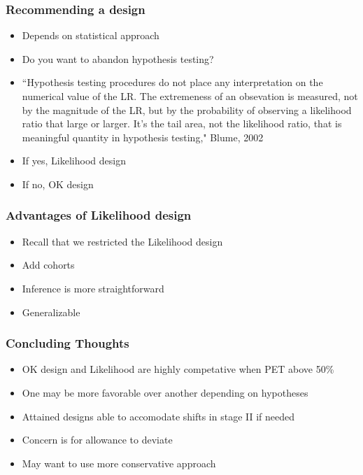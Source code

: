 \documentclass{beamer}\usepackage[]{graphicx}\usepackage[]{color}
\begin{document}
\begin{frame}
\frametitle{Recommending a design}
    \begin{itemize}
        \item Depends on statistical approach
        \item Do you want to abandon hypothesis testing?
        \item ``Hypothesis testing procedures do not place any interpretation on the numerical value of the LR. The extremeness of an obsevation is measured, not by the magnitude of the LR, but by the probability of observing a likelihood ratio that large or larger. It's the tail area, not the likelihood ratio, that is meaningful quantity in hypothesis testing," Blume, 2002
        \item If yes, Likelihood design
        \item If no, OK design %
    \end{itemize}
\end{frame}

\begin{frame}
\frametitle{Advantages of Likelihood design}
    \begin{itemize}
        \item Recall that we restricted the Likelihood design
        \item Add cohorts
        \item Inference is more straightforward %
        \item Generalizable
    \end{itemize}
\end{frame}

\begin{frame}
\frametitle{Concluding Thoughts}
    \begin{itemize}
        \item OK design and Likelihood are highly competative when PET above 50\%
        \item One may be more favorable over another depending on hypotheses
        \item Attained designs able to accomodate shifts in stage II if needed
        \item Concern is for allowance to deviate
        \item May want to use more conservative approach
    \end{itemize}
\end{frame}
\end{document}
